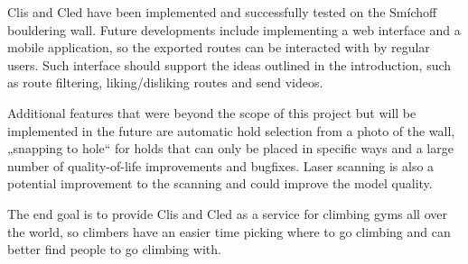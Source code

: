 Clis and Cled have been implemented and successfully tested on the Smíchoff bouldering wall.
Future developments include implementing a web interface and a mobile application, so the exported routes can be interacted with by regular users.
Such interface should support the ideas outlined in the introduction, such as route filtering, liking/disliking routes and send videos.

Additional features that were beyond the scope of this project but will be implemented in the future are automatic hold selection from a photo of the wall, „snapping to hole“ for holds that can only be placed in specific ways and a large number of quality-of-life improvements and bugfixes.
Laser scanning is also a potential improvement to the scanning and could improve the model quality.

The end goal is to provide Clis and Cled as a service for climbing gyms all over the world, so climbers have an easier time picking where to go climbing and can better find people to go climbing with.
